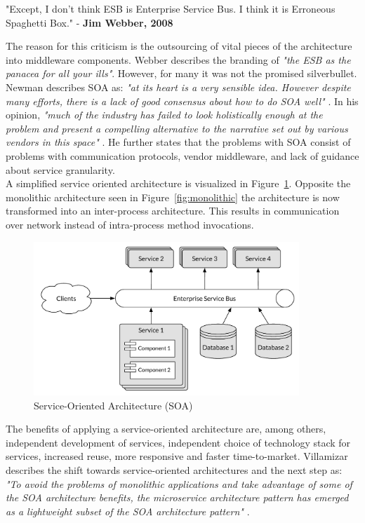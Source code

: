 \begin{citat} []
"Except, I don't think ESB is Enterprise Service Bus. I think it is Erroneous Spaghetti Box." - \textbf{Jim Webber, 2008}
\end{citat}

\noindent 
The reason for this criticism is the outsourcing of vital pieces of the architecture into middleware components. Webber describes the branding of \textit{"the ESB as the panacea for all your ills"}. However, for many it was not the promised silverbullet. Newman describes SOA as: \textit{"at its heart is a very sensible idea. However despite many efforts, there is a lack of good consensus about how to do SOA well"} \cite[p. 8]{newman2015building}. In his opinion, \textit{"much of the industry has failed to look holistically enough at the problem and present a compelling alternative to the narrative set out by various vendors in this space"} \cite[p. 8]{newman2015building}. He further states that the problems with SOA consist of problems with communication protocols, vendor middleware, and lack of guidance about service granularity. \\

\noindent
A simplified service oriented architecture is visualized in Figure~\ref{fig:soa}. Opposite the monolithic architecture seen in Figure~\ref{fig:monolithic} the architecture is now transformed into an inter-process architecture. This results in communication over network instead of intra-process method invocations.\\ 


\begin{figure}[H]
    \centering
    \includegraphics[width=10cm]{figures/service_oriented_architecture}
    \caption{Service-Oriented Architecture (SOA)}
    \label{fig:soa}
\end{figure}


\noindent
The benefits of applying a service-oriented architecture are, among others, independent development of services, independent choice of technology stack for services, increased reuse, more responsive and faster time-to-market.
\noindent
Villamizar describes the shift towards service-oriented architectures and the next step as:
\textit{"To avoid the problems of monolithic applications and take advantage of some of the SOA architecture benefits, the microservice architecture pattern has emerged as a lightweight subset of the SOA architecture pattern"} \cite[p. 584]{villamizar2015evaluating}.